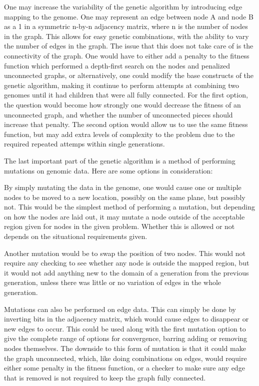 \documentclass[10pt]{article}
\begin{document}
One may increase the variability of the genetic algorithm by introducing edge mapping to the genome.  One may represent an edge between node A and node B as a 1 in a symmetric n-by-n adjacency matrix, where n is the number of nodes in the graph.  This allows for easy genetic combinations, with the ability to vary the number of edges in the graph.  The issue that this does not take care of is the connectivity of the graph.  One would have to either add a penalty to the fitness function which performed a depth-first search on the nodes and penalized unconnected graphs, or alternatively, one could modify the base constructs of the genetic algorithm, making it continue to perform attempts at combining two genomes until it had children that were all fully connected.  For the first option, the question would become how strongly one would decrease the fitness of an unconnected graph, and whether the number of unconnected pieces should increase that penalty.  The second option would allow us to use the same fitness function, but may add extra levels of complexity to the problem due to the required repeated attemps within single generations.

The last important part of the genetic algorithm is a method of performing mutations on genomic data.  Here are some options in consideration:

By simply mutating the data in the genome, one would cause one or multiple nodes to be moved to a new location, possibly on the same plane, but possibly not.  This would be the simplest method of performing a mutation, but depending on how the nodes are laid out, it may mutate a node outside of the acceptable region given for nodes in the given problem.  Whether this is allowed or not depends on the situational requirements given.

Another mutation would be to swap the position of two nodes.  This would not require any checking to see whether any node is outside the mapped region, but it would not add anything new to the domain of a generation from the previous generation, unless there was little or no variation of edges in the whole generation.

Mutations can also be performed on edge data.  This can simply be done by inverting bits in the adjacency matrix, which would cause edges to disappear or new edges to occur.  This could be used along with the first mutation option to give the complete range of options for convergence, barring adding or removing nodes themselves.  The downside to this form of mutation is that it could make the graph unconnected, which, like doing combinations on edges, would require either some penalty in the fitness function, or a checker to make sure any edge that is removed is not required to keep the graph fully connected.
\end{document}
